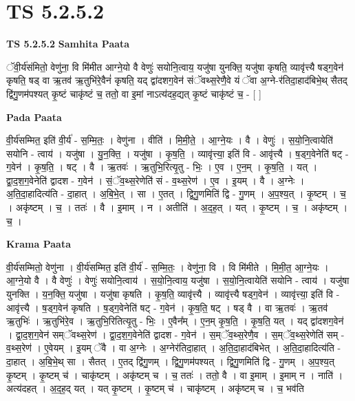 \documentclass[17pt]{extarticle}
\begin{document}
\section{ TS 5.2.5.2 }

\textbf{TS 5.2.5.2 } \newline
\textbf{Samhita Paata} \newline

ॅवी॒र्य॑संमितो॒ वेणु॑ना॒ वि मि॑मीत आग्ने॒यो वै वेणुः॑ सयोनि॒त्वाय॒ यजु॑षा युनक्ति॒ यजु॑षा कृषति॒ व्यावृ॑त्त्यै षड्ग॒वेन॑ कृषति॒ षड् वा ऋ॒तव॑ ऋ॒तुभि॑रे॒वैनं॑ कृषति॒ यद् द्वा॑दशग॒वेन॑ संॅवथ्स॒रेणै॒वे यं ॅवा अ॒ग्ने-र॑तिदा॒हाद॑बिभे॒थ् सैतद् द्वि॑गु॒णम॑पश्यत् कृ॒ष्टं चाकृ॑ष्टं च॒ ततो॒ वा इ॒मां नाऽत्य॑दह॒द्यत् कृ॒ष्टं चाकृ॑ष्टं च॒ - [  ] \newline

\textbf{Pada Paata} \newline

वी॒र्य॑सम्मित॒ इति॑ वी॒र्य॑ - स॒म्मि॒तः॒ । वेणु॑ना । वीति॑ । मि॒मी॒ते॒ । आ॒ग्ने॒यः । वै । वेणुः॑ । स॒यो॒नि॒त्वायेति॑ सयोनि - त्वाय॑ । यजु॑षा । यु॒न॒क्ति॒ । यजु॑षा । कृ॒ष॒ति॒ । व्यावृ॑त्त्या॒ इति॑ वि - आवृ॑त्त्यै । ष॒ड्ग॒वेनेति॑ षट् - ग॒वेन॑ । कृ॒ष॒ति॒ । षट् । वै । ऋ॒तवः॑ । ऋ॒तुभि॒रित्यृ॒तु - भिः॒ । ए॒व । ए॒न॒म् । कृ॒ष॒ति॒ । यत् । द्वा॒द॒श॒ग॒वेनेति॑ द्वादश - ग॒वेन॑ । सं॒ॅव॒थ्स॒रेणेति॑ सं - व॒थ्स॒रेण॑ । ए॒व । इ॒यम् । वै । अ॒ग्नेः । अ॒ति॒दा॒हादित्य॑ति - दा॒हात् । अ॒बि॒भे॒त् । सा । ए॒तत् । द्वि॒गु॒णमिति॑ द्वि - गु॒णम् । अ॒प॒श्य॒त् । कृ॒ष्टम् । च॒ । अकृ॑ष्टम् । च॒ । ततः॑ । वै । इ॒माम् । न । अतीति॑ । अ॒द॒ह॒त् । यत् । कृ॒ष्टम् । च॒ । अकृ॑ष्टम् । च॒ ।  \newline


\textbf{Krama Paata} \newline

वी॒र्य॑सम्मितो॒ वेणु॑ना । वी॒र्य॑सम्मित॒ इति॑ वी॒र्य॑ - स॒म्मि॒तः॒ । वेणु॑ना॒ वि । वि मि॑मीते । मि॒मी॒त॒ आ॒ग्ने॒यः । आ॒ग्ने॒यो वै । वै वेणुः॑ । वेणुः॑ सयोनि॒त्वाय॑ । स॒यो॒नि॒त्वाय॒ यजु॑षा । स॒यो॒नि॒त्वायेति॑ सयोनि - त्वाय॑ । यजु॑षा युनक्ति । य॒न॒क्ति॒ यजु॑षा । यजु॑षा कृषति । कृ॒ष॒ति॒ व्यावृ॑त्त्यै । व्यावृ॑त्त्यै षड्ग॒वेन॑ । व्यावृ॑त्त्या॒ इति॑ वि - आवृ॑त्त्यै । ष॒ड्ग॒वेन॑ कृषति । ष॒ड्ग॒वेनेति॑ षट् - ग॒वेन॑ । कृ॒ष॒ति॒ षट् । षड् वै । वा ऋ॒तवः॑ । ऋ॒तव॑ ऋ॒तुभिः॑ । ऋ॒तुभि॑रे॒व । ऋ॒तुभि॒रितित्यृ॒तु - भिः॒ । ए॒वैन᳚म् । ए॒न॒म् कृ॒ष॒ति॒ । कृ॒ष॒ति॒ यत् । यद् द्वा॑दशग॒वेन॑ । द्वा॒द॒श॒ग॒वेन॑ सम्ॅवथ्स॒रेण॑ । द्वा॒द॒श॒ग॒वेनेति॑ द्वादश - ग॒वेन॑ । स॒म्ॅव॒थ्स॒रेणै॒व । स॒म्ॅव॒थ्स॒रेणेति॑ सम् - व॒थ्स॒रेण॑ । ए॒वेयम् । इ॒यम् ॅवै । वा अ॒ग्नेः । अ॒ग्नेर॑तिदा॒हात् । अ॒ति॒दा॒हाद॑बिभेत् । अ॒ति॒दा॒हादित्य॑ति - दा॒हात् । अ॒बि॒भे॒थ् सा । सैतत् । ए॒तद् द्वि॑गु॒णम् । द्वि॒गु॒णम॑पश्यत् । द्वि॒गु॒णमिति॑ द्वि - गु॒णम् । अ॒प॒श्य॒त् कृ॒ष्टम् । कृ॒ष्टम् च॑ । चाकृ॑ष्टम् । अकृ॑ष्टम् च । च॒ ततः॑ । ततो॒ वै । वा इ॒माम् । इ॒माम् न । नाति॑ । अत्य॑दहत् । अ॒द॒ह॒द् यत् । यत् कृ॒ष्टम् । कृ॒ष्टम् च॑ । चाकृ॑ष्टम् । अकृ॑ष्टम् च । च॒ भव॑ति \newline
\end{document}
